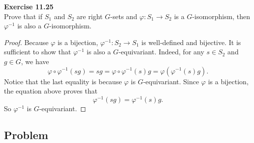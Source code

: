 \documentclass[12pt, a4paper]{article}
\theoremstyle{plain}
\newenvironment{exercise}[2][Exercise]
    { \begin{mdframed}[backgroundcolor=gray!20] \textbf{#1 #2} \\}
    {  \end{mdframed}}
\begin{document}
\begin{exercise}{11.25}
    Prove that if $S_1$ and $S_2$ are right $G$-sets and $\varphi\colon S_1\to S_2$ is a $G$-isomorphism, then $\varphi^{-1}$ is also a $G$-isomorphism.
\end{exercise}
    \begin{proof}
        Because $\varphi$ is a bijection, $\varphi^{-1}\colon S_2\to S_1$ is well-defined and bijective. It is sufficient to show that $\varphi^{-1}$ is also a $G$-equivariant. Indeed, for any $s\in S_2$ and $g\in G$, we have
        \[
        \varphi\circ \varphi^{-1}(sg) = sg = \varphi\circ \varphi^{-1}(s)g = \varphi(\varphi^{-1}(s)g).
        \]
        Notice that the last equality is because $\varphi$ is $G$-equivariant. Since $\varphi$ is a bijection, the equation above proves that 
        \[
        \varphi^{-1}(sg)=\varphi^{-1}(s)g.
        \]
        So $\varphi^{-1}$ is $G$-equivariant.
    \end{proof}



\subsection{Problem}
\end{document}
